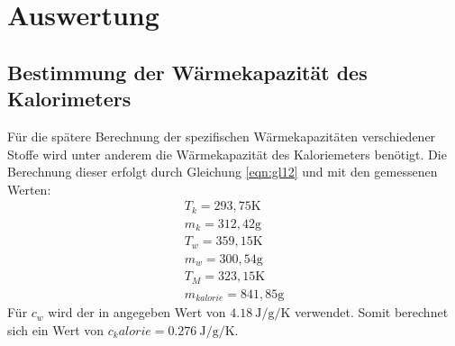 \section{Auswertung}
\label{sec:Auswertung}

\subsection{Bestimmung der Wärmekapazität des Kalorimeters}
\label{sec:Kalorie}
Für die spätere Berechnung der spezifischen Wärmekapazitäten verschiedener Stoffe wird unter anderem die Wärmekapazität des Kaloriemeters benötigt.
Die Berechnung dieser erfolgt durch Gleichung \ref{eqn:gl12} und mit den gemessenen Werten:
\begin{align*}
 T_k = 293,75 \text{K}\\
 m_k = 312,42 \text{g}\\
 T_w = 359,15 \text{K}\\
 m_w = 300,54 \text{g}\\
 T_M = 323,15 \text{K}\\
 m_{kalorie} = 841,85 \text{g}
\end{align*}
Für $c_w$ wird der in \cite{V201} angegeben Wert von $\SI{4,18}{\joule\per\gram\per\kelvin}$ verwendet.
Somit berechnet sich ein Wert von $ c_kalorie = \SI{0,276}{\joule\per\gram\per\kelvin}.$

